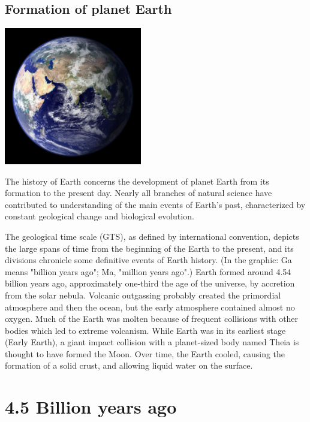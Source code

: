 \documentclass[11pt]{report}
\begin{document}
\section{Formation of planet Earth}
\vspace{2mm}\begin{center}\includegraphics[width=6cm]{./img/earth.jpg}\end{center}
The history of Earth concerns the development of planet Earth from its formation to the present day. Nearly all branches of natural science have contributed to understanding of the main events of Earth's past, characterized by constant geological change and biological evolution.

The geological time scale (GTS), as defined by international convention, depicts the large spans of time from the beginning of the Earth to the present, and its divisions chronicle some definitive events of Earth history. (In the graphic: Ga means "billion years ago"; Ma, "million years ago".) Earth formed around 4.54 billion years ago, approximately one-third the age of the universe, by accretion from the solar nebula. Volcanic outgassing probably created the primordial atmosphere and then the ocean, but the early atmosphere contained almost no oxygen. Much of the Earth was molten because of frequent collisions with other bodies which led to extreme volcanism. While Earth was in its earliest stage (Early Earth), a giant impact collision with a planet-sized body named Theia is thought to have formed the Moon. Over time, the Earth cooled, causing the formation of a solid crust, and allowing liquid water on the surface.

\chapter{4.5 Billion years ago}
\end{document}
